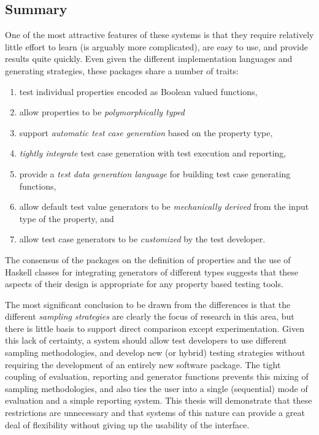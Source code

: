 \subsection{Summary}
One of the most attractive features of these systems is that
they require relatively little effort to learn
(\FEAT is arguably more complicated),
are easy to use, and provide results quite quickly.
Even given the different implementation languages and generating strategies, 
these packages share a number of traits:

\begin{enumerate}
\item test individual properties encoded as Boolean valued functions,
\item allow properties to be \emph{polymorphically typed}
\item support \emph{automatic test case generation} based on the property type,
\item \emph{tightly integrate} test case generation with test execution and reporting,
\item provide a \emph{test data generation language} for building test case generating functions,
\item allow default test value generators to be \emph{mechanically derived} from 
the input type of the property, and
\item allow test case generators to be \emph{customized} by the test developer.
\end{enumerate}

\noindent 
The consensus of the packages on the definition of properties and
the use of Haskell classes for integrating generators of different types
suggests that these aspects of their design is appropriate
for any property based testing tools.

The most significant conclusion to be drawn from the differences 
is that the different \emph{sampling strategies} are clearly the focus of research in this area,
but there is little basis to support direct comparison except experimentation.
Given this lack of certainty,
a \pbt system should allow test developers to 
use different sampling methodologies,
and develop new (or hybrid) testing strategies without
requiring the development of an entirely new software package.
The tight coupling of evaluation, reporting and generator functions
prevents this mixing of sampling methodologies,
and also ties the user into a single (sequential) mode of evaluation
and a simple reporting system.
This thesis will demonstrate that these restrictions are unnecessary
and that \pbt systems of this nature can provide a great deal of flexibility
without giving up the usability of the \QC interface.

